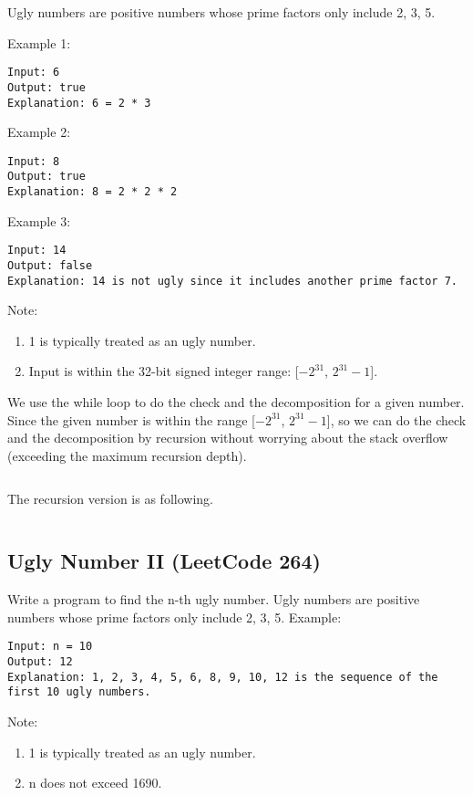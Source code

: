 \documentclass[11pt]{article}
\begin{document}
Ugly numbers are positive numbers whose prime factors only include 2, 3, 5.

Example 1:
\begin{verbatim}
Input: 6
Output: true
Explanation: 6 = 2 * 3
\end{verbatim}

Example 2:
\begin{verbatim}
Input: 8
Output: true
Explanation: 8 = 2 * 2 * 2
\end{verbatim}

Example 3:
\begin{verbatim}
Input: 14
Output: false 
Explanation: 14 is not ugly since it includes another prime factor 7.
\end{verbatim}

Note:
\begin{enumerate}
	\item 1 is typically treated as an ugly number.
	\item Input is within the 32-bit signed integer range: [$-2^{31}$, $2^{31}-1$].
\end{enumerate}

We use the while loop to do the check and the decomposition for a given number. Since the given number is within the range [$-2^{31}$, $2^{31}-1$], so we can do the check and the decomposition by recursion without worrying about the stack overflow (exceeding the maximum recursion depth). 
\inputminted[breaklines=true,frame=leftline, linenos=true]{python}{src/isUgly.py}

The recursion version is as following. 
\inputminted[breaklines=true,frame=leftline, linenos=true]{python}{src/isUgly_recursion.py}

\subsection{Ugly Number II (LeetCode 264)}
Write a program to find the n-th ugly number. 
Ugly numbers are positive numbers whose prime factors only include 2, 3, 5. 
Example:
\begin{verbatim}
Input: n = 10
Output: 12
Explanation: 1, 2, 3, 4, 5, 6, 8, 9, 10, 12 is the sequence of the first 10 ugly numbers.
\end{verbatim}
Note:  
\begin{enumerate}
\item 1 is typically treated as an ugly number.
\item n does not exceed 1690.
\end{enumerate}
\end{document}
